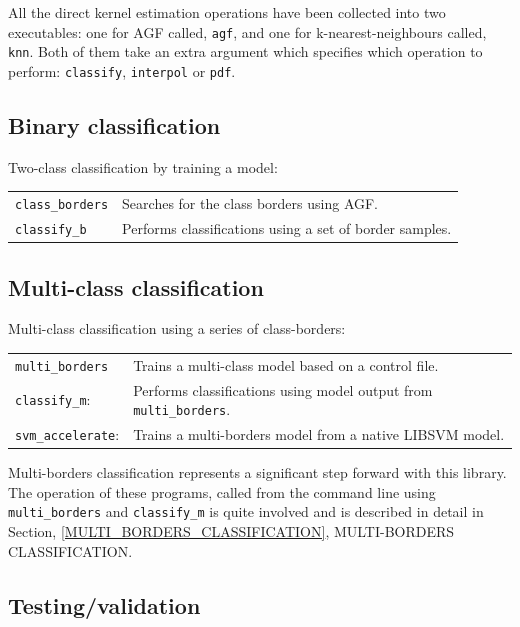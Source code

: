 \documentclass[12pt]{article}
\begin{document}
  All the direct kernel estimation operations have been collected into two executables: one for AGF called, \verb"agf", and one for k-nearest-neighbours called, \verb"knn".  Both of them take an extra argument which specifies which operation to perform: \verb"classify", \verb"interpol" or \verb"pdf".

\subsection{Binary classification}

Two-class classification by training a model:

\begin{tabular}{ll}
\verb/class_borders/ & Searches for the class borders using AGF.\\
\verb/classify_b/ & Performs classifications using a set of border samples.
\end{tabular}

\subsection{Multi-class classification}

Multi-class classification using a series of class-borders:

\begin{tabular}{ll}
\verb/multi_borders/ & 	Trains a multi-class model based on a control file.\\
\verb/classify_m/: & Performs classifications using model output from \verb/multi_borders/.\\
\verb/svm_accelerate/: & Trains a multi-borders model from a native LIBSVM model.
\end{tabular}

  Multi-borders classification represents a significant step forward with this library.  The operation of these programs, called from the command line using \verb/multi_borders/ and \verb/classify_m/ is quite involved and is described in detail in Section, \ref{MULTI_BORDERS_CLASSIFICATION}, MULTI-BORDERS CLASSIFICATION.

\subsection{Testing/validation}
\end{document}
